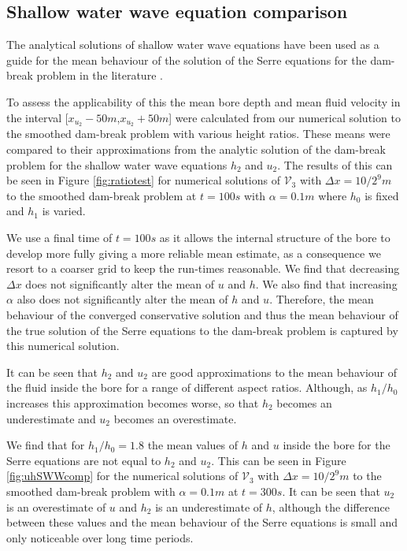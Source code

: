\documentclass[times]{elsarticle}
\begin{document}
\subsection{Shallow water wave equation comparison}
The analytical solutions of shallow water wave equations have been used as a guide for the mean behaviour of the solution of the Serre equations for the dam-break problem in the literature \cite{Hank-etal-2010-2034,Mitsotakis-etal-2014}.

To assess the applicability of this the mean bore depth and mean fluid velocity in the interval [$x_{u_2}-50m$,$x_{u_2}+50m$] were calculated from our numerical solution to the smoothed dam-break problem with various height ratios. These means were compared to their approximations from the analytic solution of the dam-break problem for the shallow water wave equations $h_2$ and $u_2$. The results of this can be seen in Figure \ref{fig:ratiotest} for numerical solutions of $\mathcal{V}_3$ with $\Delta x = 10/2^{9}m$ to the smoothed dam-break problem at $t=100s$ with $\alpha = 0.1m$ where $h_0$ is fixed and $h_1$ is varied.

We use a final time of $t=100s$ as it allows the internal structure of the bore to develop more fully giving a more reliable mean estimate, as a consequence we resort to a coarser grid to keep the run-times reasonable. We find that decreasing $\Delta x$ does not significantly alter the mean of $u$ and $h$. We also find that increasing $\alpha$ also does not significantly alter the mean of $h$ and $u$. Therefore, the mean behaviour of the converged conservative solution and thus the mean behaviour of the true solution of the Serre equations to the dam-break problem is captured by this numerical solution.

It can be seen that $h_2$ and $u_2$ are good approximations to the mean behaviour of the fluid inside the bore for a range of different aspect ratios. Although, as $h_1/h_0$ increases this approximation becomes worse, so that $h_2$ becomes an underestimate and $u_2$ becomes an overestimate.

We find that for $h_1/h_0 = 1.8$ the mean values of $h$ and $u$ inside the bore for the Serre equations are not equal to $h_2$ and $u_2$. This can be seen in Figure \ref{fig:uhSWWcomp} for the numerical solutions of $\mathcal{V}_3$ with $\Delta x = 10/2^{9}m$ to the smoothed dam-break problem with $\alpha = 0.1m$ at $t=300s$. It can be seen that $u_2$ is an overestimate of $u$ and $h_2$ is an underestimate of $h$, although the difference between these values and the mean behaviour of the Serre equations is small and only noticeable over long time periods.
\end{document}
